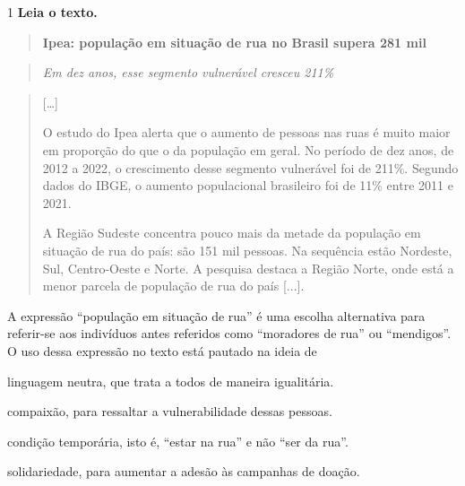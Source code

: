 

\num{1} \textbf{Leia o texto.}

\begin{quote}
\textbf{Ipea: população em situação de rua no Brasil supera 281 mil}
\end{quote}

\begin{quote}
\emph{Em dez anos, esse segmento vulnerável cresceu 211\%}
\end{quote}

\begin{quote}
{[}\ldots{]}

O estudo do Ipea alerta que o aumento de pessoas nas ruas é muito maior
em proporção do que o da população em geral. No período de dez anos, de
2012 a 2022, o crescimento desse segmento vulnerável foi de 211\%.
Segundo dados do IBGE, o aumento populacional brasileiro foi de 11\%
entre 2011 e 2021.

A Região Sudeste concentra pouco mais da metade da população em situação
de rua do país: são 151 mil pessoas. Na sequência estão Nordeste, Sul,
Centro-Oeste e Norte. A pesquisa destaca a Região Norte, onde está a
menor parcela de população de rua do país {[}...{]}.
\end{quote}


A expressão ``população em situação de rua'' é uma escolha alternativa
para referir-se aos indivíduos antes referidos como ``moradores de rua''
ou ``mendigos''. O uso dessa expressão no texto está pautado na ideia de

\begin{escolha}

\item linguagem neutra, que trata a todos de maneira igualitária.

\item compaixão, para ressaltar a vulnerabilidade dessas pessoas.

\item condição temporária, isto é, ``estar na rua'' e não ``ser da rua''.

\item solidariedade, para aumentar a adesão às campanhas de doação.

\end{escolha}


